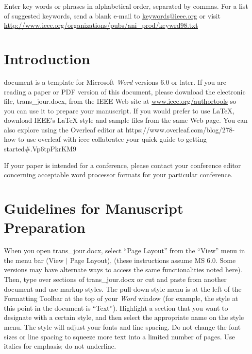 \documentclass[journal]{IEEEtai}
\begin{document}
\begin{IEEEkeywords}
Enter key words or phrases in alphabetical order, separated by commas. For a list of suggested keywords, send a blank e-mail to \href{mailto:keywords@ieee.org}{\underline{keywords@ieee.org}} or visit \href{http://www.ieee.org/organizations/pubs/ani_prod/keywrd98.txt}{\underline{http://www.ieee.org/organizations/pubs/ani\_prod/keywrd98.txt}}
\end{IEEEkeywords}



\section{Introduction}

 document is a template for Microsoft {\it Word} versions 6.0 or later. If you are reading a paper or PDF version of this document, please download the electronic file, trans\_jour.docx, from the IEEE Web site at \href{http://www.ieee.org/authortools}{www.ieee.org/authortools} so you can use it to prepare your manuscript. If you would prefer to use \LaTeX, download IEEE's  {\LaTeX} style and sample files from the same Web page. You can also explore using the Overleaf editor at {https://www.overleaf.com/blog/278-how-to-use-overleaf-with-ieee-collabratec-your-quick-guide-to-getting-started\#.Vp6tpPkrKM9}

If your paper is intended for a conference, please contact your conference editor concerning acceptable word processor formats for your particular conference.

\section{Guidelines for Manuscript Preparation}

When you open trans\_jour.docx, select ``Page Layout'' from the ``View'' menu in the menu bar (View $|$ Page Layout), (these instructions assume MS 6.0. Some versions may have alternate ways to access the same functionalities noted here). Then, type over sections of trans\_jour.docx or cut and paste from another document and use markup styles. The pull-down style menu is at the left of the Formatting Toolbar at the top of your {\it Word} window (for example, the style at this point in the document is ``Text''). Highlight a section that you want to designate with a certain style, and then select the appropriate name on the style menu. The style will adjust your fonts and line spacing. Do not change the font sizes or line spacing to squeeze more text into a limited number of pages. Use italics for emphasis; do not underline.
\end{document}
